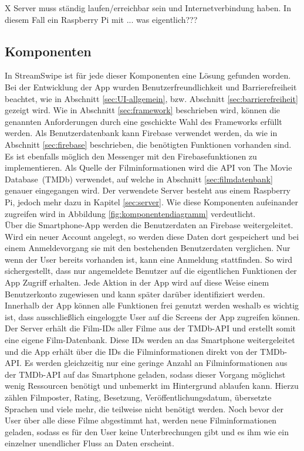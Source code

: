 X Server muss ständig laufen/erreichbar sein und Internetverbindung haben. In diesem Fall ein Raspberry Pi mit ... was eigentlich??? \\ %



\subsection{Komponenten}
\label{sec:komponenten}
In StreamSwipe ist für jede dieser Komponenten eine Lösung gefunden worden. 
Bei der Entwicklung der App wurden Benutzerfreundlichkeit und Barrierefreiheit beachtet, wie in Abschnitt \ref{sec:UI-allgemein}, bzw. Abschnitt \ref{sec:barrierefreiheit} gezeigt wird. Wie in Abschnitt \ref{sec:framework} beschrieben wird, können die genannten Anforderungen durch eine geschickte Wahl des Frameworks erfüllt werden. Als Benutzerdatenbank kann Firebase verwendet werden, da wie in Abschnitt \ref{sec:firebase} beschrieben, die benötigten Funktionen vorhanden sind. Es ist ebenfalls möglich den Messenger mit den Firebasefunktionen zu implementieren. Als Quelle der Filminformationen wird die API von \glqq The Movie Database\grqq \, (TMDb) verwendet, auf welche in Abschnitt \ref{sec:filmdatenbank} genauer eingegangen wird. Der verwendete Server besteht aus einem Raspberry Pi, jedoch mehr dazu in Kapitel \ref{sec:server}. Wie diese Komponenten aufeinander zugreifen wird in Abbildung \ref{fig:komponentendiagramm} verdeutlicht.\\
Über die Smartphone-App werden die Benutzerdaten an Firebase weitergeleitet. Wird ein neuer Account angelegt, so werden diese Daten dort gespeichert und bei einem Anmeldevorgang sie mit den bestehenden Benutzerdaten verglichen. Nur wenn der User bereits vorhanden ist, kann eine Anmeldung stattfinden. So wird sichergestellt, dass nur angemeldete Benutzer auf die eigentlichen Funktionen der App Zugriff erhalten. Jede Aktion in der App wird auf diese Weise einem Benutzerkonto zugewiesen und kann später darüber identifiziert werden. Innerhalb der App können alle Funktionen frei genutzt werden weshalb es wichtig ist, dass ausschließlich eingeloggte User auf die Screens der App zugreifen können.\\
Der Server erhält die Film-IDs aller Filme aus der TMDb-API  und erstellt somit eine eigene Film-Datenbank. Diese IDs werden an das Smartphone weitergeleitet und die App erhält über die IDs die Filminformationen direkt von der TMDb-API. Es werden gleichzeitig nur eine geringe Anzahl an Filminformationen aus der TMDb-API auf das Smartphone geladen, sodass dieser Vorgang möglichst wenig Ressourcen benötigt und unbemerkt im Hintergrund ablaufen kann. Hierzu zählen Filmposter, Rating, Besetzung, Veröffentlichungsdatum, übersetzte Sprachen und viele mehr, die teilweise nicht benötigt werden. Noch bevor der User über alle diese Filme abgestimmt hat, werden neue Filminformationen geladen, sodass es für den User keine Unterbrechungen gibt und es ihm wie ein einzelner unendlicher Fluss an Daten erscheint. \\
